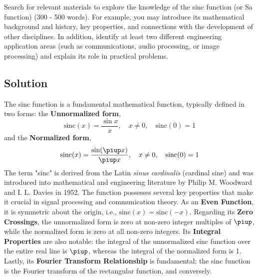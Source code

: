 \documentclass[12pt, a4paper, twoside]{ctexart}
\begin{document}
\begin{titlepage}
    \maketitlepage
\end{titlepage}
\clearpage


\begin{problem}
    \heiti{} Search for relevant materials to explore the knowledge of the sinc function (or Sa function) (300 - 500 words). For example, you may introduce its mathematical background and history, key properties, and connections with the development of other disciplines. In addition, identify at least two different engineering application areas (such as communications, audio processing, or image processing) and explain its role in practical problems.
\end{problem}

\vspace{5pt} %
\subsection*{\heiti{}Solution}
The sinc function is a fundamental mathematical function, typically defined in two forms: the \textbf{Unnormalized form},
\begin{equation*}
    \text{sinc}(x) = \frac{\sin x}{x}, \quad x \neq 0, \quad \text{sinc}(0)=1
\end{equation*}
and the \textbf{Normalized form},
\begin{equation*}
    \text{sinc}(x) = \frac{\sin(\piup x)}{\piup x}, \quad x \neq 0, \quad \text{sinc}(0)=1
\end{equation*}
The term "sinc" is derived from the Latin \textit{sinus cardinalis} (cardinal sine) and was introduced into mathematical and engineering literature by Philip M. Woodward and I. L. Davies in 1952. The function possesses several key properties that make it crucial in signal processing and communication theory. As an \textbf{Even Function}, it is symmetric about the origin, i.e., $\text{sinc}(x) = \text{sinc}(-x)$. Regarding its \textbf{Zero Crossings}, the unnormalized form is zero at non-zero integer multiples of $\piup$, while the normalized form is zero at all non-zero integers. Its \textbf{Integral Properties} are also notable: the integral of the unnormalized sinc function over the entire real line is $\piup$, whereas the integral of the normalized form is 1. Lastly, its \textbf{Fourier Transform Relationship} is fundamental; the sinc function is the Fourier transform of the rectangular function, and conversely.
\end{document}
